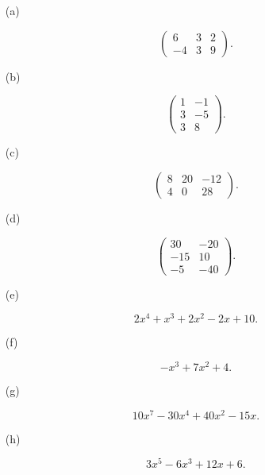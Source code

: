 \begin{Exercise}
\begin{enumerate}[(a)]
\item [(a)]
\begin{solution}
$$
\begin{pmatrix}
6 & 3 & 2 \\
-4 & 3 & 9
\end{pmatrix}.
$$
\end{solution}

\item [(b)]
\begin{solution}
$$
\begin{pmatrix}
1 & -1 \\
3 & -5 \\
3 & 8
\end{pmatrix}.
$$
\end{solution}

\item [(c)]
\begin{solution}
$$
\begin{pmatrix}
8 & 20 & -12 \\
4 & 0 & 28
\end{pmatrix}.
$$
\end{solution}

\item [(d)]
\begin{solution}
$$
\begin{pmatrix}
30 & -20 \\
-15 & 10 \\
-5 & -40
\end{pmatrix}.
$$
\end{solution}

\item [(e)]
\begin{solution}
$$
2x^4+x^3+2x^2-2x+10.
$$
\end{solution}

\item [(f)]
\begin{solution}
$$
-x^3+7x^2+4.
$$
\end{solution}

\item [(g)]
\begin{solution}
$$
10x^7-30x^4+40x^2-15x.
$$
\end{solution}

\item [(h)]
\begin{solution}
$$
3x^5-6x^3+12x+6.
$$
\end{solution}
\end{enumerate}
\end{Exercise}